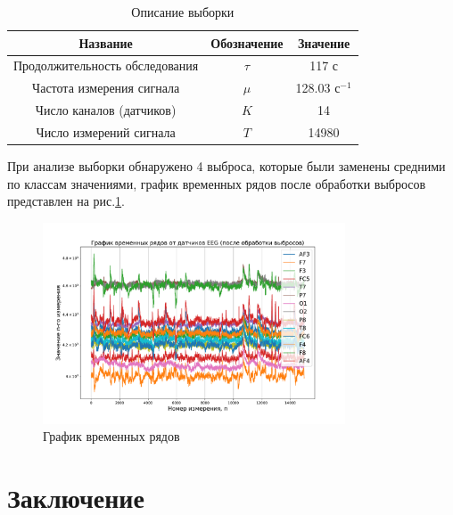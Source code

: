 \documentclass[a4paper, 12pt]{extarticle}
\begin{document}
\begin{table}
	\centering
	\caption{Описание выборки}
	\begin{tabular}{|c|c|c|}
		\hline
		Название                       & Обозначение & Значение             \\
		\hline \hline
		Продолжительность обследования & $\tau$         & 117 с                \\ \hline
		Частота измерения сигнала      & $\mu$       & 128.03 $\text{с}^{-1}$   \\ \hline
	    Число каналов (датчиков)    & $K$   & 14          \\ \hline
		Число измерений сигнала             & $T$  & 14980           \\ \hline
	\end{tabular}
	\label{table:sample}
\end{table}
При анализе выборки обнаружено 4 выброса, которые были заменены средними по классам 
значениями, график временных рядов после обработки выбросов представлен на рис.\ref{fig:2}.

\begin{figure}[h]
	\centering
	\includegraphics[width=0.8\textwidth]{Dataset.pdf}
	\caption{График временных рядов}
	\label{fig:2}
\end{figure}



\section{Заключение}


\newpage



\end{document}
